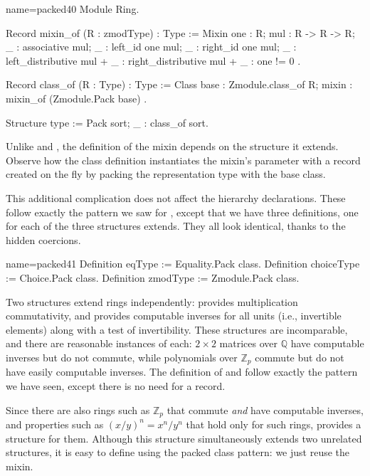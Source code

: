 \begin{coq}{name=packed40}{}
Module Ring.

Record mixin_of (R : zmodType) : Type := Mixin {
  one : R;
  mul : R -> R -> R;
  _ : associative mul;
  _ : left_id one mul;
  _ : right_id one mul;
  _ : left_distributive mul +%
  _ : right_distributive mul +%
  _ : one != 0
}.

Record class_of (R : Type) : Type := Class {
  base : Zmodule.class_of R;
  mixin : mixin_of (Zmodule.Pack base)
}.

Structure type := Pack {sort; _ : class_of sort}.
\end{coq}

Unlike  and , the definition of the
 mixin depends on the  structure it extends.
Observe how the class definition instantiates the mixin's
 parameter with a record created on the fly by packing
the representation type with the base class.

This additional complication does not affect the hierarchy
declarations.  These follow exactly the pattern we saw for
, except that we have three definitions, one for each of
the three structures  extends. They all look identical,
thanks to the hidden  coercions.

\begin{coq}{name=packed41}{}
Definition eqType := Equality.Pack class.
Definition choiceType := Choice.Pack class.
Definition zmodType := Zmodule.Pack class.
\end{coq}

Two structures extend rings independently:  provides
multiplication commutativity, and  provides computable
inverses for all units (i.e., invertible elements) along with a test
of invertibility. These structures are incomparable, and there are reasonable
instances of each: $2\times 2$ matrices over $\mathbb{Q}$ have
computable inverses but do not commute, while polynomials over
$\mathbb{Z}_p$ commute but do not have easily computable inverses.
The definition of  and  follow exactly
the pattern we have seen,
except there is no need for a  record.

Since there are also rings such as $\mathbb{Z}_p$ that commute
\emph{and} have computable inverses, and properties such as $(x/y)^n =
x ^n / y^n$ that hold only for such rings,  provides a
 structure for them. Although this structure
simultaneously extends two unrelated structures, it is easy to define
using the packed class pattern: we just reuse the 
mixin.

